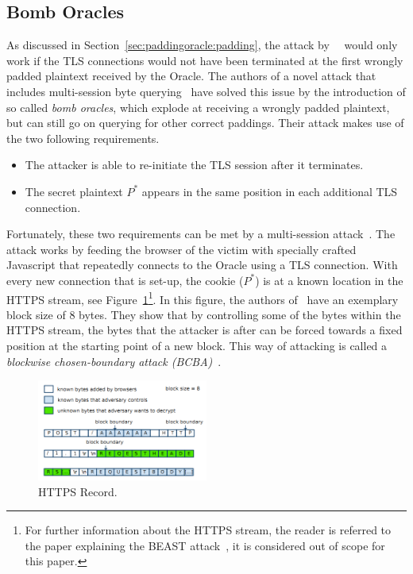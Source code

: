 \documentclass[10pt,conference,a4paper]{IEEEtran}
\begin{document}
\subsection{Bomb Oracles}
\label{sec:paddingoracle:bomb}
As discussed in Section~\ref{sec:paddingoracle:padding}, the attack by~\citeauthor{vaudenay2002security}~\cite{vaudenay2002security} would only work if the TLS connections would not have been terminated at the first wrongly padded plaintext received by the Oracle. The authors of a novel attack that includes multi-session byte querying~\cite{canvel2003password} have solved this issue by the introduction of so called \textit{bomb oracles}, which explode at receiving a wrongly padded plaintext, but can still go on querying for other correct paddings. Their attack makes use of the two following requirements.
\begin{itemize}
	\item The attacker is able to re-initiate the TLS session after it terminates.
	\item The secret plaintext $P^{*}$ appears in the same position in each additional TLS connection.
\end{itemize}
Fortunately, these two requirements can be met by a multi-session attack~\cite{vaudenay2002security}. The attack works by feeding the browser of the victim with specially crafted Javascript that repeatedly connects to the Oracle using a TLS connection. With every new connection that is set-up, the cookie ($P^{*}$) is at a known location in the HTTPS stream, see Figure~\ref{fig:beast_http}\footnote{For further information about the HTTPS stream, the reader is referred to the paper explaining the BEAST attack~\cite{duong2011here}, it is considered out of scope for this paper.}. In this figure, the authors of~\cite{duong2011here} have an exemplary block size of 8 bytes. They show that by controlling some of the bytes within the HTTPS stream, the bytes that the attacker is after can be forced towards a fixed position at the starting point of a new block.  This way of attacking is called a \textit{blockwise chosen-boundary attack (BCBA)}~\cite{duong2011here}.

\begin{figure}[h]
	\centering
	\includegraphics[width=0.5\textwidth]{beast_https.png}
	\caption{HTTPS Record.~\cite{duong2011here}}
	\label{fig:beast_http}
\end{figure}
\end{document}
